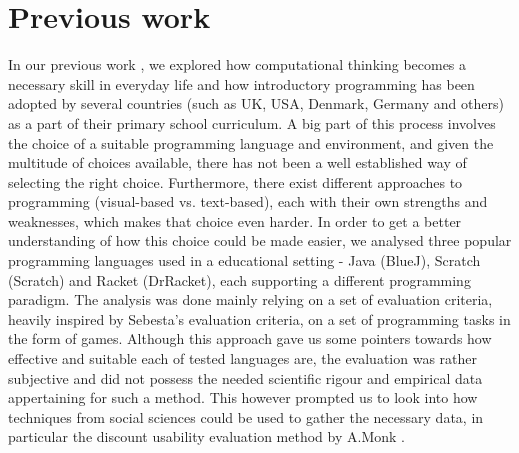 \chapter{Previous work}
\label{chapter:previous work}

In our previous work \cite{SemesterProject}, we explored how computational thinking becomes a necessary skill in everyday life and how introductory programming has been adopted by several countries (such as UK, USA, Denmark, Germany and others) as a part of their primary school curriculum. A big part of this process involves the choice of a suitable programming language and environment, and given the multitude of choices available, there has not been a well established way of selecting the right choice. Furthermore, there exist different approaches to programming (visual-based vs. text-based), each with their own strengths and weaknesses, which makes that choice even harder. In order to get a better understanding of how this choice could be made easier, we analysed three popular programming languages used in a educational setting - Java (BlueJ), Scratch (Scratch) and Racket (DrRacket), each supporting a different programming paradigm. The analysis was done mainly relying on a set of evaluation criteria, heavily inspired by Sebesta's evaluation criteria\cite{Sebesta}, on a set of programming tasks in the form of games. Although this approach gave us some pointers towards how effective and suitable each of tested languages are, the evaluation was rather subjective and did not possess the needed scientific rigour and empirical data appertaining for such a method. This however prompted us to look into how techniques from social sciences \cite{Bryman} could be used to gather the necessary data, in particular the discount usability evaluation method by A.Monk \cite{AndrewMonk}.